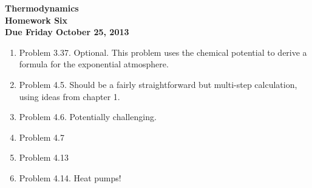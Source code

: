 \documentclass[12pt]{article}
\begin{document}
\pagestyle{empty}
 
\begin{center}
{\large {\bf Thermodynamics}}\\
\medskip
{\large {\bf Homework Six}}\\
\medskip
{ {\bf Due Friday October 25, 2013}}\\
\end{center}


\begin{enumerate}
  \item Problem 3.37.  Optional.  This problem uses the chemical
    potential to derive a formula for the exponential atmosphere. 
  \item Problem 4.5.  Should be a fairly straightforward but
    multi-step calculation, using ideas from chapter 1.  
  \item Problem 4.6.  Potentially challenging.
  \item Problem 4.7
  \item Problem 4.13
  \item Problem 4.14.  Heat pumps!
\end{enumerate}
\end{document}

